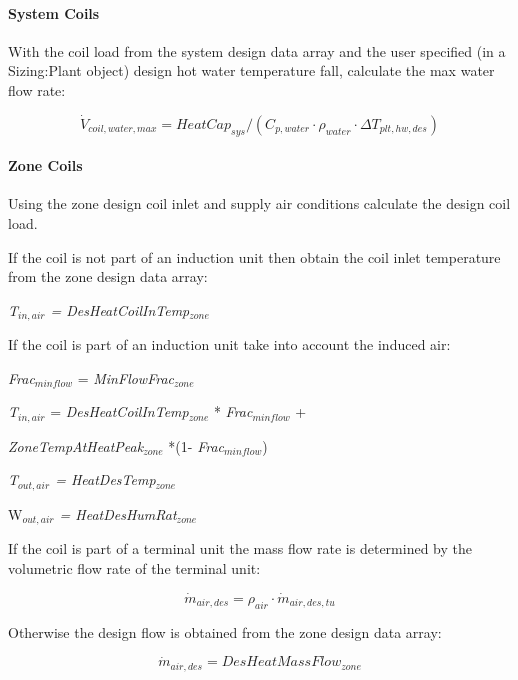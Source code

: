 \paragraph{System Coils}\label{system-coils}

With the coil load from the system design data array and the user specified (in a Sizing:Plant object) design hot water temperature fall, calculate the max water flow rate:

\begin{equation}
\dot V_{coil,water,max} = HeatCap_{sys}/(C_{p,water} \cdot \rho_{water} \cdot \Delta T_{plt,hw,des})
\end{equation}

\paragraph{Zone Coils}\label{zone-coils}

Using the zone design coil inlet and supply air conditions calculate the design coil load.

If the coil is not part of an induction unit then obtain the coil inlet temperature from the zone design data array:

\emph{T\(_{in,air}\) = DesHeatCoilInTemp\(_{zone}\)}

If the coil is part of an induction unit take into account the induced air:

\emph{Frac\(_{minflow}\)} = \emph{MinFlowFrac\(_{zone}\)}

\emph{T\(_{in,air}\)} = \emph{DesHeatCoilInTemp\(_{zone}\)} * \emph{Frac\(_{minflow}\)} +

\emph{ZoneTempAtHeatPeak\(_{zone}\)} *(1- \emph{Frac\(_{minflow}\)})

\emph{T\(_{out,air}\) = HeatDesTemp\(_{zone}\)}

W\emph{\(_{out,air}\) = HeatDesHumRat\(_{zone}\)}

If the coil is part of a terminal unit the mass flow rate is determined by the volumetric flow rate of the terminal unit:

\begin{equation}
\dot m_{air,des} = \rho_{air} \cdot \dot m_{air,des,tu}
\end{equation}

Otherwise the design flow is obtained from the zone design data array:

\begin{equation}
\dot m_{air,des} = DesHeatMassFlow_{zone}
\end{equation}

